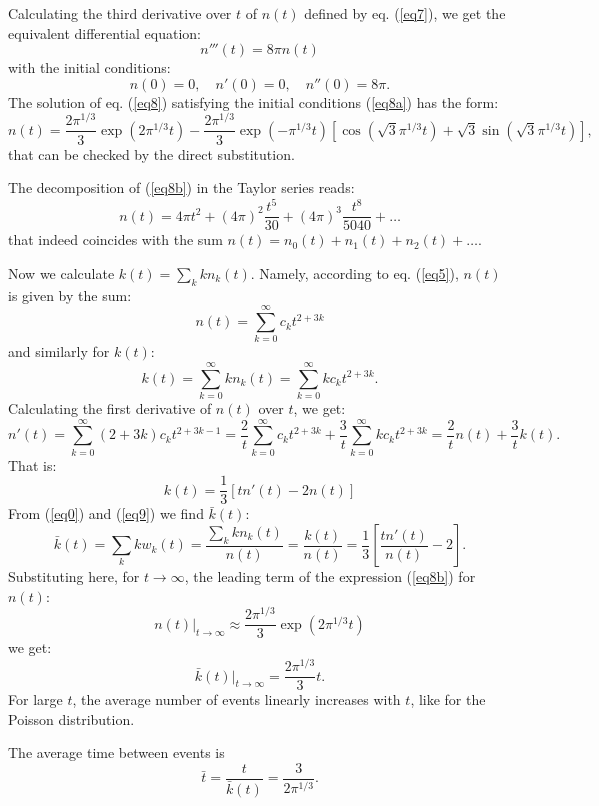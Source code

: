 \documentclass[a4paper,12pt]{article}
\begin{document}
Calculating the third derivative over $t$ of $n(t)$ defined by eq. (\ref{eq7}),
we get the equivalent differential equation:
\begin{equation}\label{eq8}
n'''(t)=8\pi n(t)
\end{equation}
with the initial conditions:
     \begin{equation}\label{eq8a}
n(0)=0,\quad n'(0)=0,\quad n''(0)=8\pi.
     \end{equation}
The solution of eq. (\ref{eq8}) satisfying the initial conditions (\ref{eq8a})
has the form:
\begin{equation}\label{eq8b}
n(t)=\frac{2\pi^{1/3}}{3}\exp(2 \pi^{1/3} t)
-\frac{2\pi^{1/3}}{3}\exp(- \pi^{1/3} t)\left[\cos(\sqrt{3}\pi^{1/3} t)
+\sqrt{3}\sin(\sqrt{3}\pi^{1/3} t)\right],
\end{equation}
that can be checked by the direct substitution.

The decomposition of (\ref{eq8b}) in the Taylor series reads:
$$
n(t)=4\pi t^2+ (4\pi)^2\frac{t^5}{30} +(4\pi)^3\frac{t^8}{5040}+\ldots
$$
that indeed coincides with the sum $n(t)=n_0(t)+n_1(t)+n_2(t)+\ldots$.


Now we calculate $k(t)=\sum_k k n_k(t)$.
Namely, according to eq. (\ref{eq5}), $n(t)$ is given by the sum:
$$
n(t)= \sum_{k=0}^{\infty}  c_{k} t^{2+3k}
$$
and similarly for $k(t)$:
$$
k(t)=\sum_{k=0}^{\infty}  k n_k(t)=\sum_{k=0}^{\infty} k c_{k} t^{2+3k}.
$$
Calculating the first derivative of $n(t)$ over $t$, we get:
$$
n'(t)= \sum_{k=0}^{\infty} (2+3k) c_{k} t^{2+3k-1}=
\frac{2}{t}\sum_{k=0}^{\infty} c_{k}  t^{2+3k}
+\frac{3}{t}\sum_{k=0}^{\infty} k c_{k} t^{2+3k}
=\frac{2}{t}n(t)+\frac{3}{t}k(t).
$$
That is:
\begin{equation}\label{eq9}
k(t)=\frac{1}{3}\left[t n'(t)-2n(t)\right]
\end{equation}
    From (\ref{eq0}) and (\ref{eq9}) we find $\bar{k}(t)$:
\begin{equation}\label{eq10}
\bar{k}(t)=\sum_k k w_k(t)=\frac{\sum_k k n_k(t)}{n(t)}=
\frac{k(t)}{n(t)}=\frac{1}{3}\left[\frac{t n'(t)}{n(t)}-2\right].
\end{equation}
Substituting here, for $t\to \infty$, the leading term of the
expression (\ref{eq8b}) for $n(t)$:
$$
n(t)|_{t\to\infty}\approx\frac{2\pi^{1/3}}{3}\exp(2 \pi^{1/3} t)
$$
we get:
$$
\bar{k}(t)|_{t\to\infty}=\frac{2\pi^{1/3}}{3}t.
$$
For large $t$,  the average number of events linearly increases
with $t$, like for the Poisson distribution.

The average time between events is
$$
\bar{t}=\frac{t}{\bar{k}(t)}=\frac{3}{2\pi^{1/3}}.
$$
\end{document}
